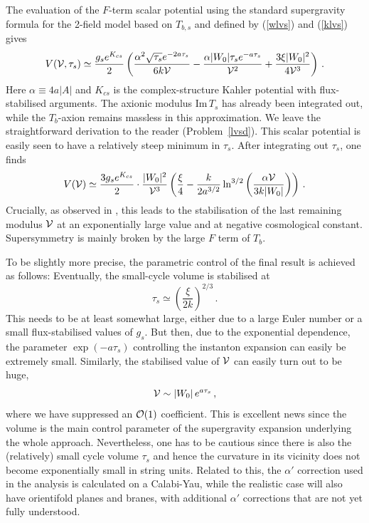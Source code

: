 \documentclass[12pt]{article}
\newcommand{\be}{\begin{equation}}
\newcommand{\ee}{\end{equation}}
\numberwithin{equation}{section}
\begin{document}
The evaluation of the $F$-term scalar potential using the standard supergravity formula for the 2-field model based on $T_{b,s}$ and defined by (\ref{wlvs}) and (\ref{klvs}) gives
\be
V({\cal V},\tau_s)\simeq \frac{g_s e^{K_{cs}}}{2}\left(
\frac{\alpha^2 \sqrt{\tau_s} e^{-2a\tau_s}}{6 k {\cal V}}
- \frac{\alpha |W_0|\tau_s e^{-a\tau_s}}{{\cal V}^2} +
 \frac{3\xi|W_0|^2}{4{\cal V}^3} \label{fsp}
\right)\,.
\ee
Here $\alpha\equiv 4a|A|$ and $K_{cs}$ is the complex-structure Kahler potential with flux-stabilised arguments. The axionic modulus Im$\,T_s$ has already been integrated out, while the $T_b$-axion remains massless in this approximation. We leave the straightforward derivation to the reader (Problem~\ref{lvsd}). This scalar potential is easily seen to have a relatively steep minimum in $\tau_s$. After integrating out $\tau_s$, one finds
\be
V({\cal V})\simeq \frac{3g_s e^{K_{cs}}}{2}\cdot \frac{|W_0|^2}{{\cal V}^3}
\left(\frac{\xi}{4}-\frac{k}{2 a^{3/2}}\ln^{3/2}\left(\frac{\alpha{\cal V}}{3k|W_0|}\right)\right)\,.
\label{vlpot}
\ee
Crucially, as observed in \cite{Balasubramanian:2005zx}, this leads to the stabilisation of the last remaining modulus ${\cal V}$ at an exponentially large value and at negative cosmological constant. Supersymmetry is mainly broken by the large $F$ term of $T_b$.

To be slightly more precise, the parametric control of the final result is achieved as follows: Eventually, the small-cycle volume is stabilised at
\be
\tau_s\simeq \left(\frac{\xi}{2 k}\right)^{2/3}\,.
\ee
This needs to be at least somewhat large, either due to a large Euler number or a small flux-stabilised values of $g_s$. But then, due to the exponential dependence, the parameter $\exp(-a\tau_s)$ controlling the instanton expansion can easily be extremely small. Similarly, the stabilised value of ${\cal V}$ can easily turn out to be huge,
\be
{\cal V}\sim |W_0|\,e^{a\tau_s}\,,
\ee
where we have suppressed an ${\cal O}(1)$ coefficient. This is excellent news since the volume is the main control parameter of the supergravity expansion underlying the whole approach. Nevertheless, one has to be cautious since there is also the (relatively) small cycle volume $\tau_s$ and hence the curvature in its vicinity does not become exponentially small in string units. Related to this, the $\alpha'$ correction used in the analysis is calculated on a Calabi-Yau, while the realistic case will also have orientifold planes and branes, with additional $\alpha'$ corrections that are not yet fully understood.
\end{document}
